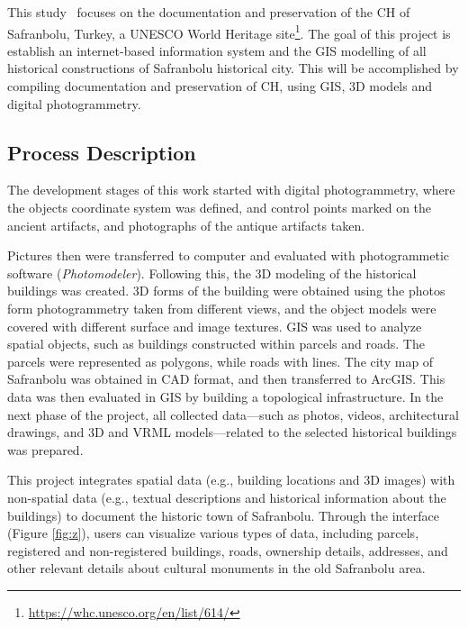 This study~\cite{arca2018development} focuses on the documentation and preservation of the \gls{CH} of Safranbolu, Turkey, a UNESCO World Heritage site\footnote{\url{https://whc.unesco.org/en/list/614/}}. 
The goal of this project is establish an internet-based information system and the \gls{GIS} modelling of all historical constructions of Safranbolu historical city.
This will be accomplished by compiling documentation and preservation of \gls{CH}, using \gls{GIS}, \gls{3D} models and digital photogrammetry.

\subsection*{Process Description}

The development stages of this work started with digital photogrammetry, where the objects coordinate system was defined, and control points marked on the ancient artifacts, and photographs of the antique artifacts taken.

Pictures then were transferred to computer and evaluated with photogrammetic software (\textit{Photomodeler}). Following this, the \gls{3D} modeling of the historical buildings was created.
\gls{3D} forms of the building were obtained using the photos form photogrammetry taken from different views, and the object models were covered with different surface and image textures.
\gls{GIS} was used to analyze spatial objects, such as buildings constructed within parcels and roads. The parcels were represented as polygons, while roads with lines.
The city map of Safranbolu was obtained in \gls{CAD} format, and then transferred to ArcGIS. This data was then evaluated in \gls{GIS} by building a topological infrastructure.
In the next phase of the project, all collected data—such as photos, videos, architectural drawings, and \gls{3D} and \gls{VRML} models—related to the selected historical buildings was prepared. 

This project integrates spatial data (e.g., building locations and \gls{3D} images) with non-spatial data (e.g., textual descriptions and historical information about the buildings) to document the historic town of Safranbolu. 
Through the interface (Figure \ref{fig:z}), users can visualize various types of data, including parcels, registered and non-registered buildings, roads, ownership details, addresses, and other relevant details about cultural monuments in the old Safranbolu area.



